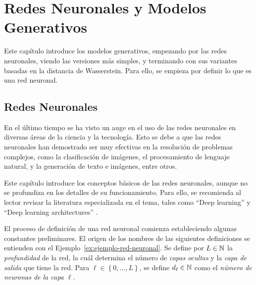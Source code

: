 \chapter{Redes Neuronales y Modelos Generativos}\label{chap:redes-neuronales-y-modelos-generativos}  %
Este capítulo introduce los modelos generativos, empezando por las redes neuronales, viendo las versiones más simples, y terminando con sus variantes basadas en la distancia de Wasserstein. Para ello, se empieza por definir lo que es una red neuronal.


\section{Redes Neuronales}\label{sec:redes-Neuronales}  %
En el último tiempo se ha visto un auge en el uso de las redes neuronales en diversas áreas de la ciencia y la tecnología. Esto se debe a que las redes neuronales han demostrado ser muy efectivas en la resolución de problemas complejos, como la clasificación de imágenes, el procesamiento de lenguaje natural, y la generación de texto e imágenes, entre otros.

Este capítulo introduce los conceptos básicos de las redes neuronales, aunque no se profundiza en los detalles de su funcionamiento. Para ello, se recomienda al lector revisar la literatura especializada en el tema, tales como ``Deep learning'' \cite{goodfellow2016deep} y ``Deep learning architectures'' \cite{calin2020deep}.

El proceso de definición de una red neuronal comienza estableciendo algunas constantes preliminares. El origen de los nombres de las siguientes definiciones se entienden con el Ejemplo~\ref{ex:ejemplo-red-neuronal}. Se define por $L\in\mathbb{N}$ la \emph{profundidad} de la red, la cuál determina el número de \textit{capas ocultas} y la \textit{capa de salida} que tiene la red. Para $\ell \in \left\{ 0,\ldots, L \right\}$, se define $d_\ell\in\mathbb{N}$ como el \emph{número de neuronas de la capa $\ell$}.


